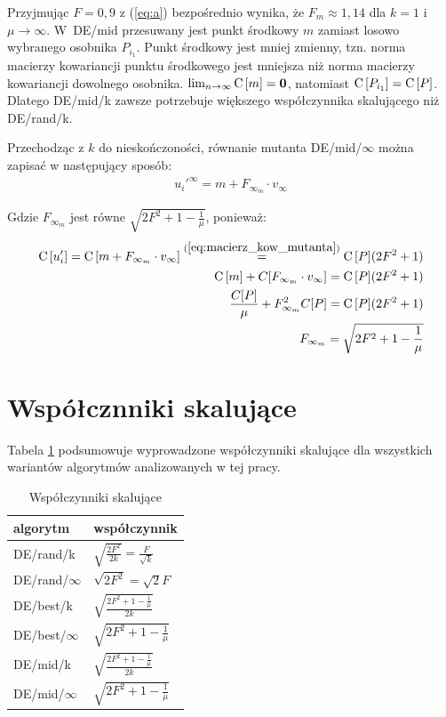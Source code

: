 \documentclass[a4paper,onecolumn,oneside,11pt,wide,floatssmall]{mwrep}
\def\C{{\rm C}\,}
\theoremstyle{definition}
\theoremstyle{plain}%
\theoremstyle{remark}
\begin{document}
Przyjmując $F=0,9$ z (\ref{eq:a}) bezpośrednio wynika, że $F_m \approx 1,14$ dla $k=1$ i $\mu\to\infty$.
W~DE/mid przesuwany jest punkt środkowy $m$ zamiast losowo wybranego osobnika $P_{i_1}$.
Punkt środkowy jest mniej zmienny, 
tzn. norma macierzy kowariancji punktu środkowego jest mniejsza niż norma macierzy kowariancji dowolnego osobnika.
$\lim_{n\to\infty} \C[m] = \textbf{0}$, natomiast $\C[P_{i_1}] = \C[P]$.
Dlatego DE/mid/k zawsze potrzebuje większego współczynnika skalującego niż DE/rand/k.

Przechodząc z $k$ do nieskończoności, równanie mutanta DE/mid/$\infty$ można zapisać
w następujący sposób:
\begin{align*}
u_i'^\infty = m + F_{\infty_m} \cdot v_\infty
\end{align*}

Gdzie $F_{\infty_m}$ jest równe $\sqrt{2F^2 + 1 - \frac{1}{\mu}}$, ponieważ:
\begin{align*}
\C[u_i'] = \C[m + F_{\infty_m} \cdot v_\infty] \overset{(\ref{eq:macierz_kow_mutanta})}{=} \C[P](2F^2 + 1) \\
\C[m] + C[F_{\infty_m} \cdot v_\infty] = \C[P](2F^2 + 1) \\
\frac{C[P]}{\mu} + F_{\infty_m}^2 C[P] = \C[P](2F^2 + 1) \\
F_{\infty_m} = \sqrt{2F^2 + 1 - \frac{1}{\mu}}
\end{align*}

\section{Współcznniki skalujące}

Tabela \ref{table:wspolczynniki} podsumowuje wyprowadzone współczynniki skalujące dla wszystkich
wariantów algorytmów analizowanych w tej pracy.

\begin{table}[H]
\centering
\begin{tabular}{ l | l }
algorytm         & współczynnik \\ \hline
DE/rand/k        & $\sqrt{\frac{2F^2}{2k}} = \frac{F}{\sqrt{k}}$ \\ 
DE/rand/$\infty$ & $\sqrt{2F^2} = \sqrt{2}F$ \\ \hline
DE/best/k        & $\sqrt{\frac{2F^2 + 1 - \frac{1}{\mu}}{2k}}$ \\
DE/best/$\infty$ & $\sqrt{2F^2 + 1 - \frac{1}{\mu}}$ \\ \hline
DE/mid/k         & $\sqrt{\frac{2F^2 + 1 - \frac{1}{\mu}}{2k}}$ \\
DE/mid/$\infty$  & $\sqrt{2F^2 + 1 - \frac{1}{\mu}}$ \\
\end{tabular}
\caption{Współczynniki skalujące}
\label{table:wspolczynniki}
\end{table}
\end{document}
